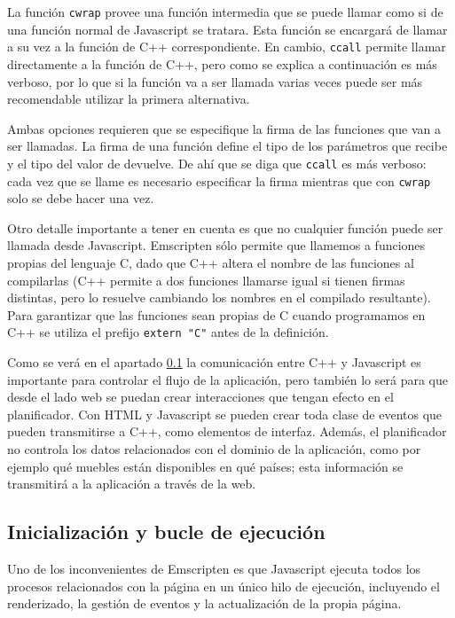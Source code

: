 La función \texttt{cwrap} provee una función intermedia que se puede llamar como si de una función normal de Javascript se tratara. Esta función se encargará de llamar a su vez a la función de C++ correspondiente. En cambio, \texttt{ccall} permite llamar directamente a la función de C++, pero como se explica a continuación es más verboso, por lo que si la función va a ser llamada varias veces puede ser más recomendable utilizar la primera alternativa.

Ambas opciones requieren que se especifique la firma de las funciones que van a ser llamadas. La firma de una función define el tipo de los parámetros que recibe y el tipo del valor de devuelve. De ahí que se diga que \texttt{ccall} es más verboso: cada vez que se llame es necesario especificar la firma mientras que con \texttt{cwrap} solo se debe hacer una vez.

Otro detalle importante a tener en cuenta es que no cualquier función puede ser llamada desde Javascript. Emscripten sólo permite que llamemos a funciones propias del lenguaje C, dado que C++ altera el nombre de las funciones al compilarlas (C++ permite a dos funciones llamarse igual si tienen firmas distintas, pero lo resuelve cambiando los nombres en el compilado resultante). Para garantizar que las funciones sean propias de C cuando programamos en C++ se utiliza el prefijo \texttt{extern "C"} antes de la definición.

Como se verá en el apartado \ref{init_emscripten} la comunicación entre C++ y Javascript es importante para controlar el flujo de la aplicación, pero también lo será para que desde el lado web se puedan crear interacciones que tengan efecto en el planificador. Con HTML y Javascript se pueden crear toda clase de eventos que pueden transmitirse a C++, como elementos de interfaz. Además, el planificador no controla los datos relacionados con el dominio de la aplicación, como por ejemplo qué muebles están disponibles en qué países; esta información se transmitirá a la aplicación a través de la web.


\subsection{Inicialización y bucle de ejecución}
\label{init_emscripten}
Uno de los inconvenientes de Emscripten es que Javascript ejecuta todos los procesos relacionados con la página en un único hilo de ejecución, incluyendo el renderizado, la gestión de eventos y la actualización de la propia página.

